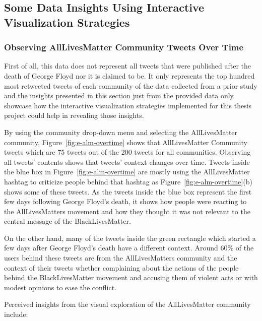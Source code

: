 \subsection{Some Data Insights Using Interactive Visualization Strategies}

\subsubsection{Observing AllLivesMatter Community Tweets Over Time}

First of all, this data does not represent all tweets that were published after the death of George Floyd nor it is claimed to be. It only represents the top hundred most retweeted tweets of each community of the data collected from a prior study and the insights presented in this section just from the provided data only showcase how the interactive visualization strategies implemented for this thesis project could help in revealing those insights. 


By using the community drop-down menu and selecting the AllLivesMatter community, Figure~\ref{fig:e-alm-overtime} shows that AllLivesMatter Community tweets which are 75 tweets out of the 200 tweets for all communities. Observing all tweets' contents shows that tweets' context changes over time. Tweets inside the blue box in Figure~\ref{fig:e-alm-overtime} are mostly using the AllLivesMatter hashtag to criticize people behind that hashtag as Figure~\ref{fig:e-alm-overtime}(b) shows some of these tweets. As the tweets inside the blue box represent the first few days following George Floyd's death, it shows how people were reacting to the AllLivesMatters movement and how they thought it was not relevant to the central message of the BlackLivesMatter. 


On the other hand, many of the tweets inside the green rectangle which started a few days after George Floyd's death have a different context. Around 60\% of the users behind these tweets are from the AllLivesMatters community and the context of their tweets whether complaining about the actions of the people behind the BlackLivesMatter movement and accusing them of violent acts or with modest opinions to ease the conflict. 


Perceived insights from the visual exploration of the AllLivesMatter community include:

